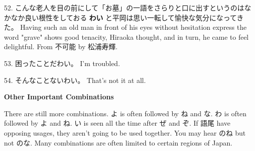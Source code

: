 \par{52. こんな老人を目の前にして「お墓」の一語をさらりと口に出すというのはなかなか良い根性をしておる \textbf{わい }と平岡は思い一転して愉快な気分になってきた。 \hfill\break
Having such an old man in front of his eyes without hesitation express the word "grave" shows good tenacity, Hiraoka thought, and in turn, he came to feel delightful. \hfill\break
From 不可能 by 松浦寿輝. }

\par{53. 困ったことだわい。 \hfill\break
I'm troubled. }

\par{54. そんなことないわい。 \hfill\break
That's not it at all.  }
 
\begin{center}
\textbf{Other Important Combinations }
\end{center}
 
\par{There are still more combinations. よ is often followed by ね and な. わ is often followed by よ and ね. い is seen all the time after ぜ and ぞ. If 語尾 have opposing usages, they aren't going to be used together. You may hear のね but not のな. Many combinations are often limited to certain regions of Japan. }
    